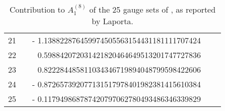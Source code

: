 \begin{table}[h]
\begin{center}
\begin{tabular}{rrrrr}
   21 &  & - 1.138822876459974505563154431181111707424  \\%
   22 &  & \phantom{+} 0.598842072031421820464649513201747727836  \\%
   23 &  & \phantom{+} 0.822284485811034346719894048799598422606  \\%
   24 &  & - 0.872657392077131517978401982381415610384  \\%
   25 &  & - 0.117949868787420797062780493486346339829  \\%
\hline
\end{tabular}
\end{center}
\caption{
Contribution to $A^{(8)}_1$ of the 25 gauge sets of
, as reported by Laporta.
}
\label{Laporta17:tableset}
\end{table}

